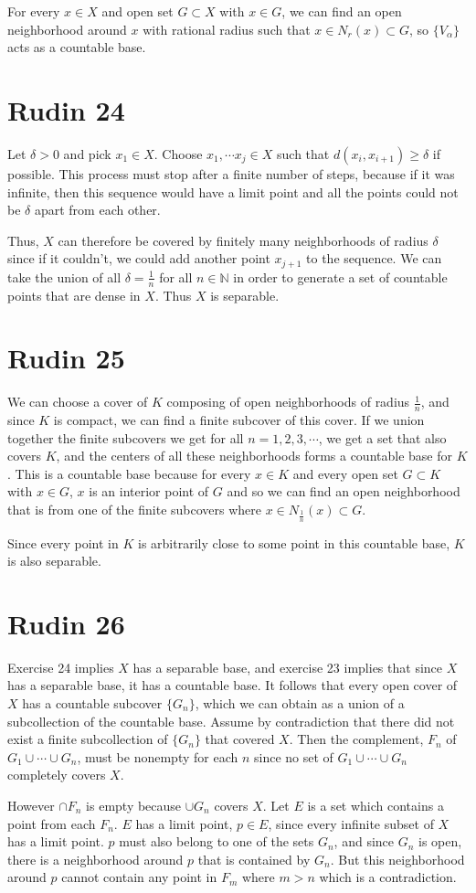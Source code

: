 \documentclass{article}
\begin{document}
For every $x \in X$ and open set $G \subset X$ with $x \in G$,
we can find an open neighborhood around $x$ with rational radius 
such that $x \in N_r(x) \subset G$, so $\{V_{\alpha}\}$ 
acts as a countable base.
\newpage 

\section*{Rudin 24}
Let $\delta > 0$ and pick $x_1 \in X$.
Choose $x_1, \cdots x_j \in X$
such that $d(x_i, x_{i+1}) \geq \delta$ if possible.
This process must stop after a finite number of steps,
because if it was infinite, then this sequence would have 
a limit point and all the points could not be $\delta$
apart from each other.

Thus, $X$ can therefore be covered by finitely
many neighborhoods of radius $\delta$
since if it couldn't, 
we could add another point $x_{j+1}$ to the sequence.
We can take the union of all 
$\delta = \frac{1}{n}$ for all $n \in \mathbb{N}$
in order to generate a set of countable points
that are dense in $X$.
Thus $X$ is separable.


\section*{Rudin 25}
We can choose a cover of $K$ composing of open neighborhoods of radius $\frac{1}{n}$,
and since $K$ is compact, we can find a finite subcover of this cover.
If we union together the finite subcovers we get for all $n = 1,2,3,\cdots$,
we get a set that also covers $K$, and the centers of all these neighborhoods
forms a countable base for $K$. 
This is a countable base because for every $x \in K$ and every open set $G \subset K$ with $x \in G$,
$x$ is an interior point of $G$ and so we can find an open neighborhood that is 
from one of the finite subcovers where $x \in N_{\frac{1}{n}}(x) \subset G$.

Since every point in $K$ is arbitrarily close to some point in this 
countable base, $K$ is also separable.

\section*{Rudin 26}
Exercise 24 implies $X$ has a separable base, and exercise 23 implies that 
since $X$ has a separable base, it has a countable base.
It follows that every open cover of $X$ has a countable subcover $\{G_n\}$,
which we can obtain as a union of a subcollection of the countable base.
Assume by contradiction that there did not exist a finite subcollection of 
$\{G_n\}$ that covered $X$. 
Then the complement, $F_n$ of $G_1 \cup \cdots \cup G_n$,
must be nonempty for each $n$ since no set of $G_1 \cup \cdots \cup G_n$
completely covers $X$.

However $\cap F_n$ is empty because $\cup G_n$ covers $X$.
Let $E$ is a set which contains a point from each $F_n$.
$E$ has a limit point, $p \in E$, since every infinite subset of $X$ has a limit point.
$p$ must also belong to one of the sets $G_n$, and since $G_n$ is open,
there is a neighborhood around $p$ that is contained by $G_n$. 
But this neighborhood around $p$ cannot contain any point in $F_m$
where $m > n$ which is a contradiction.
\end{document}
